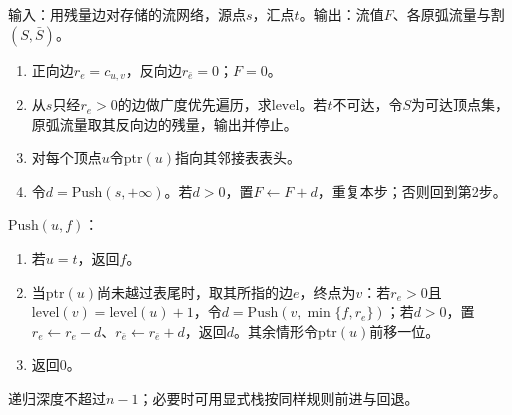 \begin{algorithm}[Dinic算法]
\label{alg:graph-opt-dinic}
输入：用残量边对存储的流网络，源点$s$，汇点$t$。输出：流值$F$、各原弧流量与割$(S,\bar S)$。
\begin{enumerate}
  \item 正向边$r_e=c_{u,v}$，反向边$r_{\bar e}=0$；$F=0$。
  \item 从$s$只经$r_e>0$的边做广度优先遍历，求$\mathrm{level}$。若$t$不可达，令$S$为可达顶点集，原弧流量取其反向边的残量，输出并停止。
  \item 对每个顶点$u$令$\mathrm{ptr}(u)$指向其邻接表表头。
  \item 令$d=\mathrm{Push}(s,+\infty)$。若$d>0$，置$F\gets F+d$，重复本步；否则回到第2步。
\end{enumerate}
$\mathrm{Push}(u,f)$：
\begin{enumerate}
  \item 若$u=t$，返回$f$。
  \item 当$\mathrm{ptr}(u)$尚未越过表尾时，取其所指的边$e$，终点为$v$：若$r_e>0$且$\mathrm{level}(v)=\mathrm{level}(u)+1$，令$d=\mathrm{Push}(v,\min\{f,r_e\})$；若$d>0$，置$r_e\gets r_e-d$、$r_{\bar e}\gets r_{\bar e}+d$，返回$d$。其余情形令$\mathrm{ptr}(u)$前移一位。
  \item 返回$0$。
\end{enumerate}
\end{algorithm}

递归深度不超过$n-1$；必要时可用显式栈按同样规则前进与回退。

